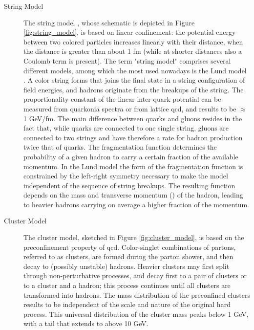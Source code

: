 \begin{description}
\item[String Model] The string model \cite{Artru:1974hr}, whose schematic is depicted in Figure \ref{fig:string_model}, is based on linear confinement: the potential energy between two colored particles increases linearly with their distance, when the distance is greater than about 1 fm (while at shorter distances also a Coulomb term is present). The term "string model" comprises several different models, among which the most used nowadays is the Lund model \cite{Andersson:1983ia,Andersson:1998tv}. 
A color string forms that joins the final state in a string configuration of field energies, and hadrons originate from the breakups of the string. The proportionality constant of the linear inter-quark potential can be measured from quarkonia spectra or from lattice \gls{qcd}, and results to be $\approx$ 1 GeV/fm.
The main difference between quarks and gluons resides in the fact that, while quarks are connected to one single string, gluons are connected to two strings and have therefore a rate for hadron production twice that of quarks. 
The fragmentation function determines the probability of a given hadron to carry a certain fraction of the available momentum. In the Lund model the form of the fragmentation function is constrained by the left-right symmetry necessary to make the model independent of the sequence of string breakups. The resulting function depends on the mass and transverse momentum (\pt) of the hadron, leading to heavier hadrons carrying on average a higher fraction of the momentum.

\item[Cluster Model] The cluster model, sketched in Figure \ref{fig:cluster_model}, is based on the preconfinement property of \gls{qcd}. 
Color-singlet combinations of partons, referred to as clusters, are formed during the parton shower,  
and then decay to (possibly unstable) hadrons. 
Heavier clusters may first split through non-perturbative processes, and decay first to a pair of clusters or to a cluster and a hadron; 
this process continues until all clusters are transformed into hadrons. 
The mass distribution of the preconfined clusters results to be independent of the scale and nature of the original hard process. This universal distribution of the cluster mass peaks below 1 GeV, with a tail that extends to above 10 GeV.

\end{description}

